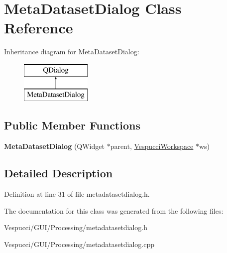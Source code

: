 \hypertarget{class_meta_dataset_dialog}{}\section{Meta\+Dataset\+Dialog Class Reference}
\label{class_meta_dataset_dialog}
Inheritance diagram for Meta\+Dataset\+Dialog\+:\begin{figure}[H]
\begin{center}
\leavevmode
\includegraphics[height=2.000000cm]{class_meta_dataset_dialog}
\end{center}
\end{figure}
\subsection*{Public Member Functions}
\begin{DoxyCompactItemize}
\item 
{\bfseries Meta\+Dataset\+Dialog} (Q\+Widget $\ast$parent, \hyperlink{class_vespucci_workspace}{Vespucci\+Workspace} $\ast$ws)\hypertarget{class_meta_dataset_dialog_ad418f69956d5b548f61530c98dfb1e6b}{}\label{class_meta_dataset_dialog_ad418f69956d5b548f61530c98dfb1e6b}

\end{DoxyCompactItemize}


\subsection{Detailed Description}


Definition at line 31 of file metadatasetdialog.\+h.



The documentation for this class was generated from the following files\+:\begin{DoxyCompactItemize}
\item 
Vespucci/\+G\+U\+I/\+Processing/metadatasetdialog.\+h\item 
Vespucci/\+G\+U\+I/\+Processing/metadatasetdialog.\+cpp\end{DoxyCompactItemize}
